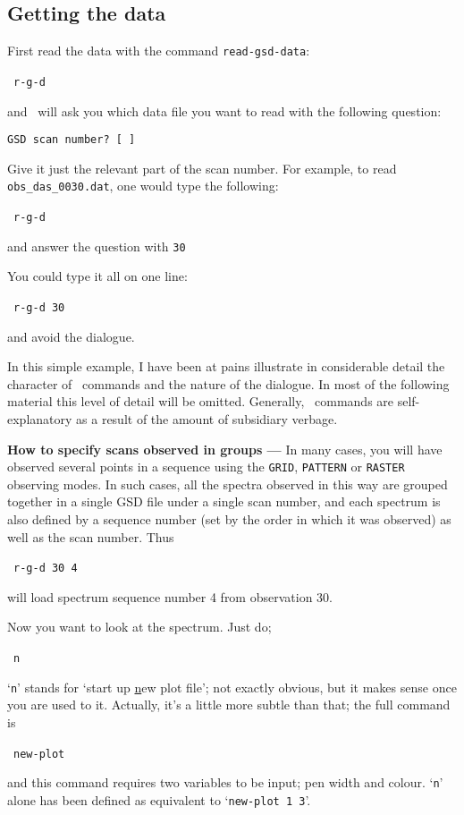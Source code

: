 \subsection{Getting the data}
\label{sec:getting-the-data}
First read the data with the command {\tt read-gsd-data}:

\SP\ {\tt r-g-d}

and \SPECX\ will ask you which data file you want to read with the
following question:

{\tt GSD scan number? [ ]}

Give it just the relevant part of the scan number.  For example, to
read {\tt obs\_das\_0030.dat}, one would type the following:

\SP\ {\tt r-g-d}

and answer the question with {\tt 30}

You could type it all on one line:

\SP\ {\tt r-g-d 30}

and avoid the dialogue.

In this simple example, I have been at pains illustrate in
considerable detail the character of \SPECX\ commands and the nature
of the dialogue. In most of the following material this level of
detail will be omitted. Generally, \SPECX\ commands are
self-explanatory as a result of the amount of subsidiary verbage.

\aside
{\bf How to specify scans observed in groups --- } In many cases, you
will have observed several points in a sequence using the {\tt GRID},
{\tt PATTERN} or {\tt RASTER} observing modes. In such cases, all the
spectra observed in this way are grouped together in a single GSD file
under a single scan number, and each spectrum is also defined by a
sequence number (set by the order in which it was observed) as well as
the scan number.  Thus

\SP\ {\tt r-g-d 30 4}

will load spectrum sequence number 4 from observation 30.
\myline

Now you want to look at the spectrum.  Just do;

\SP\ {\tt n}

`{\tt{n}}' stands for `start up \underline{n}ew plot file'; not exactly
obvious, but it makes sense once you are used to it. Actually, it's a
little more subtle than that; the full command is

\SP\ {\tt new-plot} 

and this command requires two variables to be input; pen width and
colour. `{\tt{n}}' alone has been defined as equivalent to
`{\tt{new-plot 1 3}}'.


